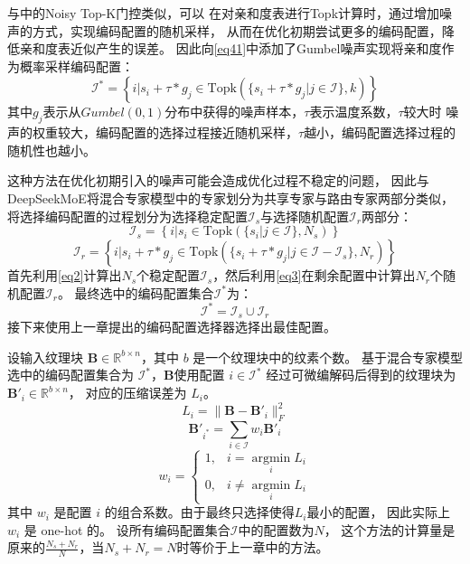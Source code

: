 与中的Noisy Top-K门控类似，可以
在对亲和度表进行Topk计算时，通过增加噪声的方式，实现编码配置的随机采样，
从而在优化初期尝试更多的编码配置，降低亲和度表近似产生的误差。
因此向\eqref{eq41}中添加了Gumbel噪声\cite{jang2016categorical}实现将亲和度作为概率采样编码配置：
\begin{equation}
\mathcal{I}^*=\left\{i|s_i+\tau*g_j\in\text{Topk}(\{s_i+\tau*g_j|j\in\mathcal{I}\},k)\right\}
\end{equation}
其中$g_j$表示从$Gumbel(0,1)$分布中获得的噪声样本，$\tau$表示温度系数，$\tau$较大时
噪声的权重较大，编码配置的选择过程接近随机采样，$\tau$越小，编码配置选择过程的随机性也越小。

这种方法在优化初期引入的噪声可能会造成优化过程不稳定的问题，
因此与DeepSeekMoE\cite{dai2024deepseekmoe}将混合专家模型中的专家划分为共享专家与路由专家两部分类似，
将选择编码配置的过程划分为选择稳定配置$\mathcal{I}_s$与选择随机配置$\mathcal{I}_r$两部分：
\begin{equation}
\label{eq2}
    \mathcal{I}_s=\left\{i|s_i\in\text{Topk}(\{s_i|j\in\mathcal{I}\},N_s)\right\}
\end{equation}
\begin{equation}
\label{eq3}
\mathcal{I}_r=\left\{i|s_i+\tau*g_j\in\text{Topk}(\{s_i+\tau*g_j|j\in\mathcal{I}-\mathcal{I}_s\},N_r)\right\}
\end{equation}
首先利用\eqref{eq2}计算出$N_s$个稳定配置$\mathcal{I}_s$，然后利用\eqref{eq3}在剩余配置中计算出$N_r$个随机配置$\mathcal{I}_r$。
最终选中的编码配置集合$\mathcal{I}^*$为：
\begin{equation}
\mathcal{I}^*=\mathcal{I}_{s}\cup\mathcal{I}_r
\end{equation}
接下来使用上一章提出的编码配置选择器选择出最佳配置。

设输入纹理块 $\mathbf{B}\in\mathbb{R}^{b\times n}$，其中 $b$ 是一个纹理块中的纹素个数。
基于混合专家模型选中的编码配置集合为 $\mathcal{I}^*$，$\mathbf{B}$使用配置 $i\in\mathcal{I}^*$ 
经过可微编解码后得到的纹理块为 $\mathbf{B}'_i\in\mathbb{R}^{b\times n}$，
对应的压缩误差为 $L_i$。
\begin{equation}
L_i=\|\mathbf{B}-\mathbf{B}'_i\|_F^2
\end{equation}
\begin{equation}
\mathbf{B}'_{i^*}=\sum_{i\in\mathcal{I}} w_i\mathbf{B}'_i
\end{equation}
\begin{equation}
    w_i =\left\{\begin{matrix}
        1,& i=\mathop{\arg\min}\limits_{i} L_i
        \\0,& i\ne\mathop{\arg\min}\limits_{i} L_i
        \end{matrix}\right.
\end{equation}
其中 $w_i$ 是配置 $i$ 的组合系数。由于最终只选择使得$L_i$最小的配置，
因此实际上 $w_i$ 是 one-hot 的。
设所有编码配置集合$\mathcal{I}$中的配置数为$N$，
这个方法的计算量是原来的$\frac{N_s+N_r}{N}$，当$N_s+N_r=N$时等价于上一章中的方法。

